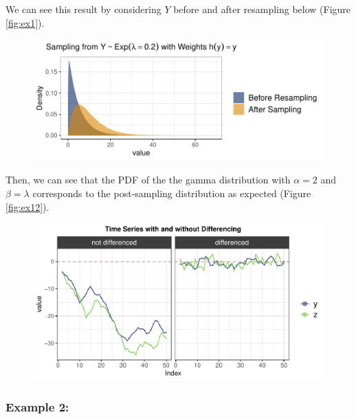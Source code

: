 \documentclass[12pt,twoside]{smiththesis}
\begin{document}
We can see this result by considering \(Y\) before and after resampling below (Figure \ref{fig:ex1}).
\begin{figure}

{\centering \includegraphics[width=1\linewidth]{thesis_files/figure-latex/unnamed-chunk-23-1} 

}

\caption{\label{fig:ex1}}\label{fig:unnamed-chunk-23}
\end{figure}
Then, we can see that the PDF of the the gamma distribution with \(\alpha = 2\) and \(\beta = \lambda\) corresponds to the post-sampling distribution as expected (Figure \ref{fig:ex12}).
\begin{figure}

{\centering \includegraphics[width=1\linewidth]{thesis_files/figure-latex/unnamed-chunk-24-1} 

}

\caption{\label{fig:ex12}}\label{fig:unnamed-chunk-24}
\end{figure}
\newpage

\hypertarget{example-2}{%
\subsubsection{Example 2:}\label{example-2}}
\end{document}
